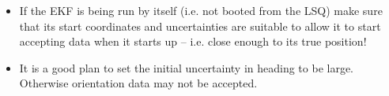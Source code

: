 \documentclass[a4paper,10pt]{article}
\begin{document}
\begin{itemize}
\item If the EKF is being run by itself (i.e. not booted from the
LSQ) make sure that its start coordinates and uncertainties are
suitable to allow it to start accepting data when it starts up --
i.e. close enough to its true position!

\item It is a good plan to set the initial uncertainty in heading to
be large. Otherwise orientation data may not be accepted.


\end{itemize}
\end{document}
